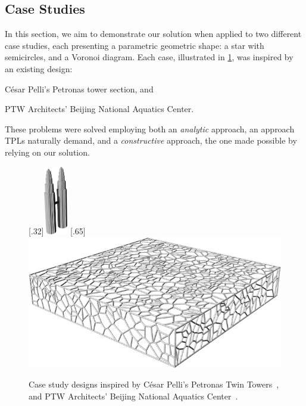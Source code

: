\subsection{Case Studies}%
\label{sec:eval.studies}

In this section, we aim to demonstrate our solution when applied to two
different case studies, each presenting a parametric geometric shape: a star
with semicircles, and a Voronoi diagram.  Each case, illustrated in
\cref{fig:eval.studies.designs}, was inspired by an existing design:
\begin{enumerate*}[label= (\arabic*)]
  \item César Pelli's Petronas tower section, and
  \item PTW Architects' Beijing National Aquatics Center.
\end{enumerate*}
These problems were solved employing both an \textit{analytic} approach, an
approach \acp{TPL} naturally demand, and a \textit{constructive} approach, the
one made possible by relying on our solution.

\begin{figure}[htb]
    [.32\linewidth]{\includegraphics[height=3cm]{fig/case-study-petronas}}
  \hfill
    [.65\linewidth]{%
      \includegraphics[width=\linewidth]{fig/case-study-water-cube}}
  \caption{\label{fig:eval.studies.designs}
    Case study designs inspired by César Pelli's Petronas Twin
    Towers~, and PTW Architects'
    Beijing National Aquatics
    Center~.}%
\end{figure}

